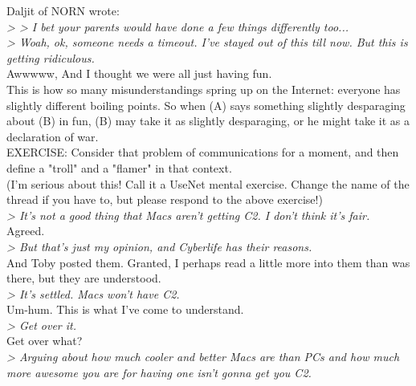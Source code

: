 \documentclass[11pt,twoside,a4paper]{article}
\begin{document}
\begin{multicols*}{2}
Daljit of NORN wrote:~\\

\emph{> > I bet your parents would have done a few things differently too...}~\\

\emph{> Woah, ok, someone needs a timeout.  I've stayed out of this till now.  But this is getting ridiculous.}~\\

Awwwww, And I thought we were all just having fun.~\\

This is how so many misunderstandings spring up on the Internet: everyone has slightly different boiling points. So when (A) says something slightly desparaging about (B) in fun, (B) may take it as slightly desparaging, or he might take it as a declaration of war.~\\

EXERCISE: Consider that problem of communications for a moment, and then define a "troll" and a "flamer" in that context.~\\

(I'm serious about this! Call it a UseNet mental exercise. Change the name of the thread if you have to, but please respond to the above exercise!)~\\

\emph{> It's not a good thing that Macs aren't getting C2.  I don't think it's fair.}~\\

Agreed.~\\

\emph{> But that's just my opinion, and Cyberlife has their reasons.}~\\

And Toby posted them. Granted, I perhaps read a little more into them than was there, but they are understood.~\\

\emph{> It's settled.  Macs won't have C2.}~\\

Um-hum. This is what I've come to understand.~\\

\emph{> Get over it.}~\\

Get over what?~\\

\emph{> Arguing about how much cooler and better Macs are than PCs and how much more awesome you are for having one isn't gonna get you C2.}~\\


\end{multicols*}
\end{document}
